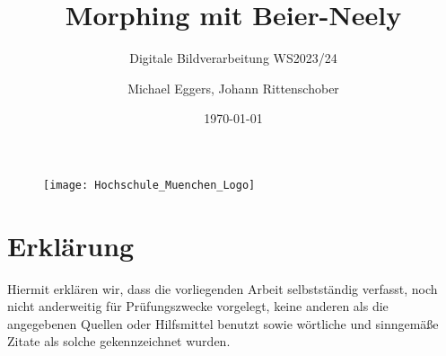 
\newcommand{\leftblankpage}
{
	\begingroup
	\clearpage
	\vspace*{60mm}
	\noindent
	\centering
	\makebox[0.5\textwidth][c]{\emph{This page intentionally left blank}}
	\clearpage
	\endgroup
}

\subtitle{\LARGE Digitale Bildverarbeitung WS2023/24}
\title{Morphing mit Beier-Neely}
\author{Michael Eggers, Johann Rittenschober}
\date{\today}

\maketitle




\begingroup
\begin{figure}[h]
	\centering
		\texttt{[image: Hochschule\_Muenchen\_Logo]}
	\label{fig:HM_FK04_Logo}
\end{figure}
\let\clearpage\relax
\chapter*{Erklärung}
\noindent
Hiermit erklären wir, dass die vorliegenden Arbeit selbstständig verfasst, noch nicht anderweitig für Prüfungszwecke vorgelegt, keine anderen als die angegebenen Quellen oder Hilfsmittel benutzt sowie wörtliche und sinngemäße Zitate als solche gekennzeichnet wurden.
\par
\vspace{20mm}
\noindent
{}

\vspace{20mm}

\noindent
{}
\par
\noindent
{}
\endgroup

